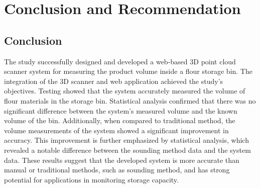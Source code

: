 \renewcommand{\thechapter}{\Roman{chapter}}
\chapter{Conclusion and Recommendation}
\renewcommand{\thechapter}{\arabic{chapter}}
\label{ch:Result and Discussion}
\thispagestyle{empty}

\section{Conclusion}
\label{ch5:sec:conlusion}


The study successfully designed and developed a web-based 3D point cloud scanner system for measuring the product volume inside a flour storage bin. The integration of the 3D scanner and web application achieved the study's objectives. Testing showed that the system accurately measured the volume of flour materials in the storage bin. Statistical analysis confirmed that there was no significant difference between the system's measured volume and the known volume of the bin. Additionally, when compared to traditional method, the volume measurements of the system showed a significant improvement in accuracy. This improvement is further emphasized by statistical analysis, which revealed a notable difference between the sounding method data and the system data. These results suggest that the developed system is more accurate than manual or traditional methods, such as sounding method, and has strong potential for applications in monitoring storage capacity.


